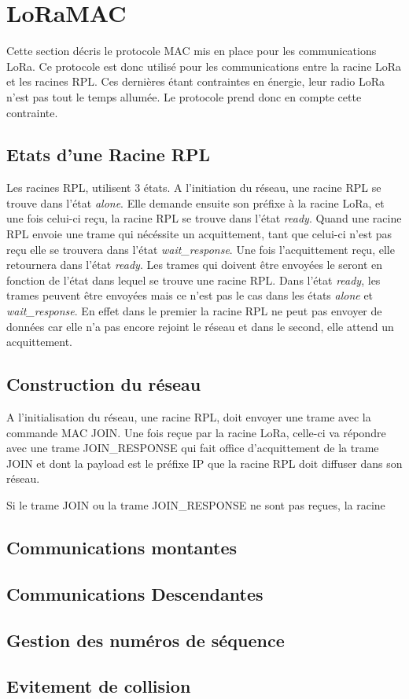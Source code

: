 \section{LoRaMAC}\label{sec:archi-loramac:proto}
\renewcommand{\rightmark}{LoRaMac}

    Cette section décris le protocole MAC mis en place pour les communications LoRa. Ce protocole est donc utilisé pour les communications entre la racine LoRa et les racines RPL. Ces dernières étant contraintes en énergie, leur radio LoRa n'est pas tout le temps allumée. Le protocole prend donc en compte cette contrainte.

\subsection{Etats d'une Racine RPL}
    Les racines RPL, utilisent 3 états. A l'initiation du réseau, une racine RPL se trouve dans l'état \textit{alone}. Elle demande ensuite son préfixe à la racine LoRa, et une fois celui-ci reçu, la racine RPL se trouve dans l'état \textit{ready}. Quand une racine RPL envoie une trame qui nécéssite un acquittement, tant que celui-ci n'est pas reçu elle se trouvera dans l'état \textit{wait\_response}. Une fois l'acquittement reçu, elle retournera dans l'état \textit{ready}.
    Les trames qui doivent être envoyées le seront en fonction de l'état dans lequel se trouve une racine RPL. Dans l'état \textit{ready}, les trames peuvent être envoyées mais ce n'est pas le cas dans les états \textit{alone} et \textit{wait\_response}. En effet dans le premier la racine RPL ne peut pas envoyer de données car elle n'a pas encore rejoint le réseau et dans le second, elle attend un acquittement.

\subsection{Construction du réseau}
    A l'initialisation du réseau, une racine RPL, doit envoyer une trame avec la commande MAC JOIN. Une fois reçue par la racine LoRa, celle-ci va répondre avec une trame JOIN\_RESPONSE qui fait office d'acquittement de la trame JOIN et dont la payload est le préfixe IP que la racine RPL doit diffuser dans son réseau.

    Si le trame JOIN ou la trame JOIN\_RESPONSE ne sont pas reçues, la racine 

\subsection{Communications montantes}

\subsection{Communications Descendantes}

\subsection{Gestion des numéros de séquence}

\subsection{Evitement de collision}
